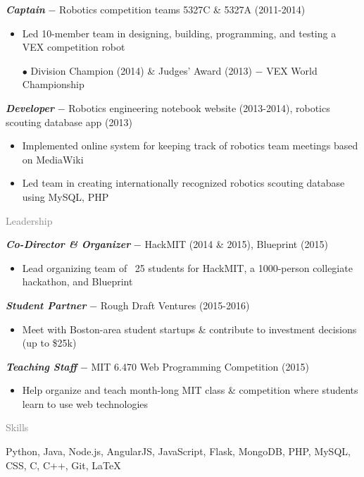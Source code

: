 \documentclass[11pt]{article}
\newcommand{\rsection}[1]{\vspace{1em}\textcolor{gray}{\Large \robotoslab #1}\vspace{0.5em}}
\newcommand{\bt}[1]{\textit{\textbf{#1}}} %
\newcommand{\gap}[0]{\vspace{0.5em}} %
\newcommand{\dash}[0]{ $-$ } %
\begin{document}
\bt{Captain}\dash Robotics competition teams 5327C \& 5327A (2011-2014)

\begin{itemize}
\item Led 10-member team in designing, building, programming, and testing a VEX competition robot
\item[$\bullet$] Division Champion (2014) \& Judges' Award (2013)\dash VEX World Championship
\end{itemize}

\gap

\bt{Developer}\dash Robotics engineering notebook website (2013-2014), robotics scouting database app (2013)

\begin{itemize}
\item Implemented online system for keeping track of robotics team meetings based on MediaWiki
\item Led team in creating internationally recognized robotics scouting database using MySQL, PHP
\end{itemize}

\rsection{Leadership}

\bt{Co-Director \& Organizer}\dash HackMIT (2014 \& 2015), Blueprint (2015)

\begin{itemize}
\item Lead organizing team of ~25 students for HackMIT, a 1000-person collegiate hackathon, and Blueprint
\end{itemize}

\gap

\bt{Student Partner}\dash Rough Draft Ventures (2015-2016)

\begin{itemize}
\item Meet with Boston-area student startups \& contribute to investment decisions (up to \$25k)
\end{itemize}

\gap

\bt{Teaching Staff}\dash MIT 6.470 Web Programming Competition (2015)

\begin{itemize}
\item Help organize and teach month-long MIT class \& competition where students learn to use web technologies
\end{itemize}

\rsection{Skills}

Python, Java, Node.js, AngularJS, JavaScript, Flask, MongoDB, PHP, MySQL, CSS, C, C++, Git, LaTeX
\end{document}
